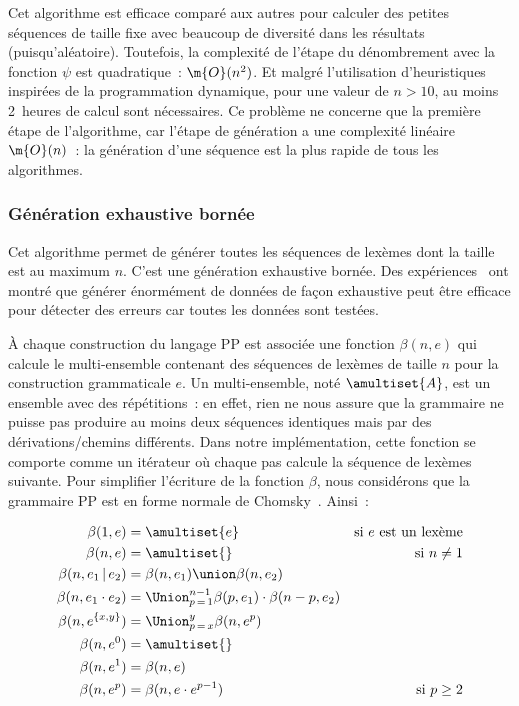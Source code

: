 Cet algorithme est efficace comparé aux autres pour calculer des petites
séquences de taille fixe avec beaucoup de diversité dans les résultats
(puisqu'aléatoire). Toutefois, la complexité de l'étape du dénombrement avec la
fonction $\psi$ est quadratique~: $\m{O}(n^2)$. Et malgré l'utilisation
d'heuristiques inspirées de la programmation dynamique, pour une valeur de $n >
10$, au moins 2~heures de calcul sont nécessaires. Ce problème ne concerne que
la première étape de l'algorithme, car l'étape de génération a une complexité
linéaire $\m{O}(n)$~: la génération d'une séquence est la plus rapide de tous
les algorithmes.

\subsubsection{Génération exhaustive bornée}
\label{subsection:data:bounded_exhaustive_generation}

Cet algorithme permet de générer toutes les séquences de lexèmes dont la taille
est au maximum $n$. C'est une génération exhaustive bornée. Des
expériences~ ont montré que générer énormément
de données de façon exhaustive peut être efficace pour détecter des erreurs car
toutes les données sont testées.

À chaque construction du langage PP est associée une fonction $\beta(n, e)$ qui
calcule le multi-ensemble contenant des séquences de lexèmes de taille $n$ pour
la construction grammaticale $e$. Un multi-ensemble, noté $\amultiset{A}$, est
un ensemble avec des répétitions~: en effet, rien ne nous assure que la
grammaire ne puisse pas produire au moins deux séquences identiques mais par des
dérivations/chemins différents. Dans notre implémentation, cette fonction se
comporte comme un itérateur où chaque pas calcule la séquence de lexèmes
suivante. Pour simplifier l'écriture de la fonction $\beta$, nous considérons
que la grammaire PP est en forme normale de Chomsky~. Ainsi~:

\begin{align*}
%
\beta(1, e) & =
    \amultiset{e}
    &
    \text{si $e$ est un lexème}
    \\
%
\beta(n, e) & =
    \amultiset{}
    &
    \text{si $n \neq 1$}
    \\
%
\beta(n, e_1 \,\vert\, e_2) & =
    \beta(n, e_1) \union \beta(n, e_2)
    \\
%
\beta(n, e_1 \cdot e_2) & =
    \Union_{p \,=\, 1}^{n - 1}
    \beta(p, e_1) \cdot \beta(n - p, e_2)
    \\
%
\beta(n, e^{\{x, y\}}) & =
    \Union_{p \,=\, x}^y \beta(n, e^p)
    \\
%
%
\beta(n, e^0) & =
    \amultiset{}
    \\
%
\beta(n, e^1) & =
    \beta(n, e)
    \\
%
\beta(n, e^p) & =
    \beta(n, e \cdot e^{p - 1})
    &
    \text{si $p \geq 2$}
%
\end{align*}

